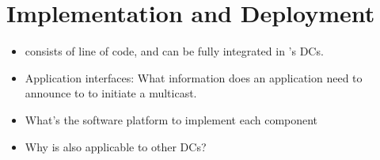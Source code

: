 \section{Implementation and Deployment}

\begin{itemize}
\item \name consists of \fillme line of \fillme code, and can be fully integrated in \company's DCs. 

\item Application interfaces: What information does an application need to announce to \name to initiate a multicast.

\item What's the software platform to implement each component

\item Why \name is also applicable to other DCs?

\end{itemize}

